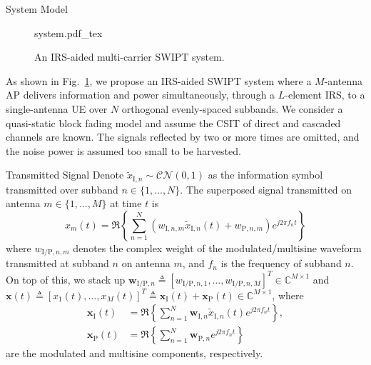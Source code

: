 \documentclass[journal]{IEEEtran}
\begin{document}
	\begin{section}{System Model}\label{se:system_model}
		\begin{figure}[!t]
			\centering
			\def\svgwidth{0.9\columnwidth}
			{system.pdf_tex}
			\caption{An IRS-aided multi-carrier SWIPT system.}
			\label{fi:system}
		\end{figure}

		As shown in Fig.~\ref{fi:system}, we propose an IRS-aided SWIPT system where a $M$-antenna AP delivers information and power simultaneously, through a $L$-element IRS, to a single-antenna UE over $N$ orthogonal evenly-spaced subbands. We consider a quasi-static block fading model and assume the CSIT of direct and cascaded channels are known. The signals reflected by two or more times are omitted, and the noise power is assumed too small to be harvested.


		\begin{subsection}{Transmitted Signal}
			Denote $\tilde{x}_{\mathrm{I},n}\sim\mathcal{CN}(0,1)$ as the information symbol transmitted over subband $n \in \{1, \dots, N\}$. The superposed signal transmitted on antenna $m \in \{1, \dots, M\}$ at time $t$ is
			\begin{equation}\label{eq:x_m}
				x_m(t)=\Re\left\{\sum_{n=1}^N\left({w_{\mathrm{I},n,m}\tilde{x}_{\mathrm{I},n}(t)}+w_{\mathrm{P},n,m}\right){e^{j2{\pi}{f_n}{t}}}\right\}
			\end{equation}
			where $w_{\mathrm{I/P},n,m}$ denotes the complex weight of the modulated/multisine waveform transmitted at subband $n$ on antenna $m$, and $f_n$ is the frequency of subband $n$. On top of this, we stack up $\boldsymbol{w}_{\mathrm{I/P},n} \triangleq [w_{\mathrm{I/P},n,1},\dots,w_{\mathrm{I/P},n,M}]^T \in \mathbb{C}^{M \times 1}$ and $\boldsymbol{x}(t) \triangleq [x_1(t),\dots,x_M(t)]^T \triangleq \boldsymbol{x}_{\mathrm{I}}(t)+\boldsymbol{x}_{\mathrm{P}}(t) \in \mathbb{C}^{M \times 1}$, where
			\begin{align}
				\boldsymbol{x}_{\mathrm{I}}(t) &= \Re{\left\{\sum_{n=1}^N\boldsymbol{w}_{\mathrm{I},n}\tilde{x}_{\mathrm{I},n}(t){e^{j2{\pi}{f_n}{t}}}\right\}},\label{eq:x_I}\\
				\boldsymbol{x}_{\mathrm{P}}(t) &= \Re{\left\{\sum_{n=1}^N\boldsymbol{w}_{\mathrm{P},n}{e^{j2{\pi}{f_n}{t}}}\right\}}\label{eq:x_P}
			\end{align}
			are the modulated and multisine components, respectively.
		\end{subsection}



\end{section}
\end{document}
